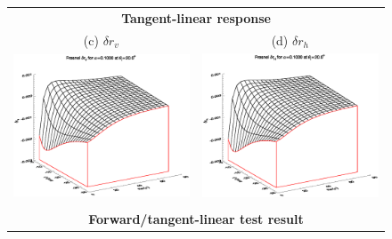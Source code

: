 \begin{figure}[htp]
\begin{tabular}{c c}
    \multicolumn{2}{c}{\sffamily\textbf{Tangent-linear response}}\\
    \textsf{(c)} $\delta r_v$ &
    \textsf{(d)} $\delta r_h$ \\
    \includegraphics[bb=120 240 508 540,clip,scale=0.5]{graphics/Fresnel/FWDTL/TLdrv_a0.1000_z20.0.eps} &
    \includegraphics[bb=120 240 508 540,clip,scale=0.5]{graphics/Fresnel/FWDTL/TLdrh_a0.1000_z20.0.eps} \\\\
    \multicolumn{2}{c}{\sffamily\textbf{Forward/tangent-linear test result}}\\

\end{tabular}
\end{figure}
